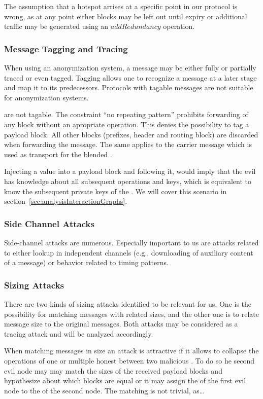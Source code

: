 The assumption that a hotspot arrises at a specific point in our protocol is wrong, as at any point either blocks may be left out until expiry or additional traffic may be generated using an $addRedundancy$ operation.

\subsubsection{Message Tagging and Tracing}
When using an anonymization system, a message may be either fully or partially traced or even tagged. Tagging allows one to recognize a message at a later stage and map it to its predecessors. Protocols with tagable messages are not suitable for anonymization systems.

\VortexMessages{} are not tagable. The constraint ``no repeating pattern'' prohibits forwarding of any block without an apropriate operation. This denies the possibility to tag a payload block. All other blocks (prefixes, header and routing block) are discarded when forwarding the message. The same applies to the carrier message which is used as transport for the blended \VortexMessage.

Injecting a value into a payload block and following it, would imply that the evil \VortexNode has knowledge about all subsequent operations and keys, which is equivalent to know the subsequent private keys of the \VortexNodes. We will cover this scenario in section~\ref{sec:analysisInteractionGraphs}.

\subsubsection{Side Channel Attacks}
Side-channel attacks are numerous. Especially important to us are attacks related to either lookup in independent channels (e.g., downloading of auxiliary content of a message) or behavior related to timing patterns.

\subsubsection{Sizing Attacks}
There are two kinds of sizing attacks identified to be relevant for us. One is the possibility for matching messages with related sizes, and the other one is to relate message size to the original messages. Both attacks may be considered as a tracing attack and will be analyzed accordingly. 

When matching messages in size an attack is attractive if it allows to collapse the operations of one or multiple honest \VortexNodes{} between two malicious \VortexNodes. To do so he second evil node may  may match the sizes of the received payload blocks and hypothesize about which blocks are equal or it may assign the  of the first evil node to the  of the second node. The matching is not trivial, as\ldots

